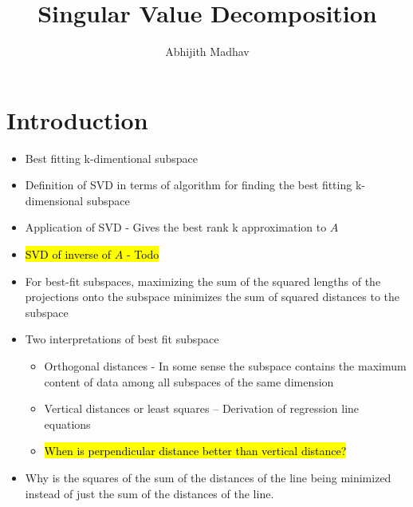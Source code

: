 \documentclass[12pt]{article}
\title{\textbf{Singular Value Decomposition}}
\author{Abhijith Madhav}
\date{}
\begin{document}
\maketitle

\section{Introduction}
\begin{itemize}

\item
Best fitting k-dimentional subspace

\item
Definition of SVD in terms of algorithm for finding the best fitting k-dimensional subspace

\item
Application of SVD - Gives the best rank k approximation to $A$

\item
\hl{SVD of inverse of $A$ - Todo}

\item
For best-fit subspaces, maximizing the sum of the squared lengths of the projections onto the subspace minimizes the sum of squared distances to the subspace

\item
Two interpretations of best fit subspace

\begin{itemize}

\item
Orthogonal distances -  In some sense the subspace contains the maximum 
content of data among all subspaces of the same dimension

\item
Vertical distances or least squares – Derivation of regression line equations

\item
\hl{When is perpendicular distance better than vertical distance?}

\end{itemize}

\item
Why is the squares of the sum of the distances of the line being minimized instead of just the sum of the distances of the line.

\end{itemize}

\end{document}
